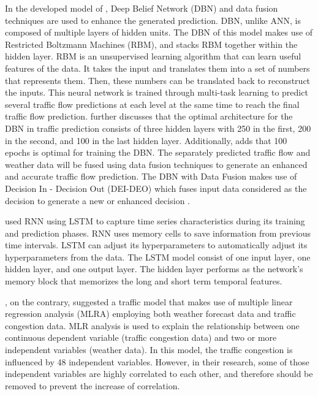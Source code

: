 In the developed model of , Deep Belief Network (DBN) and data fusion techniques are used to enhance the generated prediction. DBN, unlike ANN, is composed of multiple layers of hidden units. The DBN of this model makes use of Restricted Boltzmann Machines (RBM), and stacks RBM together within the hidden layer. RBM is an unsupervised learning algorithm that can learn useful features of the data. It takes the input and translates them into a set of numbers that represents them. Then, these numbers can be translated back to reconstruct the inputs. This neural network is trained through multi-task learning to predict several traffic flow predictions at each level at the same time to reach the final traffic flow prediction.  further discusses that the optimal architecture for the DBN in traffic prediction consists of three hidden layers with 250 in the first, 200 in the second, and 100 in the last hidden layer. Additionally,  adds that 100 epochs is optimal for training the DBN. The separately predicted traffic flow and weather data will be fused using data fusion techniques to generate an enhanced and accurate traffic flow prediction. The DBN with Data Fusion makes use of Decision In - Decision Out (DEI-DEO) which fuses input data considered as the decision to generate a new or enhanced decision .

 used RNN using LSTM to capture time series characteristics during its training and prediction phases. RNN uses memory cells to save information from previous time intervals. LSTM can adjust its hyperparameters to automatically adjust its hyperparameters from the data. The LSTM model consist of one input layer, one hidden layer, and one output layer. The hidden layer performs as the network's memory block that memorizes the long and short term temporal features. 

, on the contrary, suggested a traffic model that makes use of multiple linear regression analysis (MLRA) employing both weather forecast data and traffic congestion data. MLR analysis is used to explain the relationship between one continuous dependent variable (traffic congestion data) and two or more independent variables (weather data). In this model, the traffic congestion is influenced by 48 independent variables. However, in their research, some of those independent variables are highly correlated to each other, and therefore should be removed to prevent the increase of correlation. 






